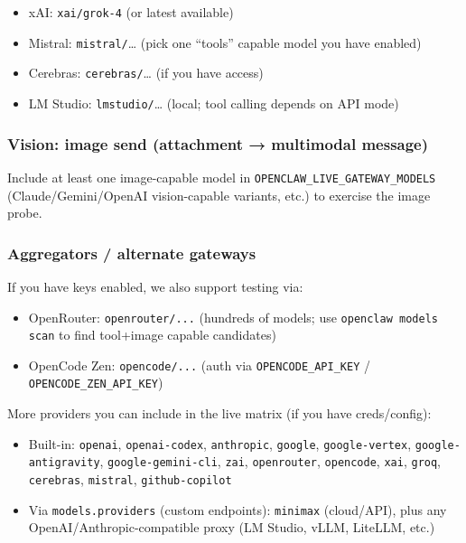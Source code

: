 \begin{itemize}
  \item xAI: \texttt{xai/grok-4} (or latest available)
  \item Mistral: \texttt{mistral/}… (pick one “tools” capable model you have enabled)
  \item Cerebras: \texttt{cerebras/}… (if you have access)
  \item LM Studio: \texttt{lmstudio/}… (local; tool calling depends on API mode)
\end{itemize}


\subsubsection{Vision: image send (attachment → multimodal message)}


Include at least one image-capable model in \texttt{OPENCLAW\_LIVE\_GATEWAY\_MODELS} (Claude/Gemini/OpenAI vision-capable variants, etc.) to exercise the image probe.

\subsubsection{Aggregators / alternate gateways}


If you have keys enabled, we also support testing via:

\begin{itemize}
  \item OpenRouter: \texttt{openrouter/...} (hundreds of models; use \texttt{openclaw models scan} to find tool+image capable candidates)
  \item OpenCode Zen: \texttt{opencode/...} (auth via \texttt{OPENCODE\_API\_KEY} / \texttt{OPENCODE\_ZEN\_API\_KEY})
\end{itemize}


More providers you can include in the live matrix (if you have creds/config):

\begin{itemize}
  \item Built-in: \texttt{openai}, \texttt{openai-codex}, \texttt{anthropic}, \texttt{google}, \texttt{google-vertex}, \texttt{google-antigravity}, \texttt{google-gemini-cli}, \texttt{zai}, \texttt{openrouter}, \texttt{opencode}, \texttt{xai}, \texttt{groq}, \texttt{cerebras}, \texttt{mistral}, \texttt{github-copilot}
  \item Via \texttt{models.providers} (custom endpoints): \texttt{minimax} (cloud/API), plus any OpenAI/Anthropic-compatible proxy (LM Studio, vLLM, LiteLLM, etc.)
\end{itemize}



